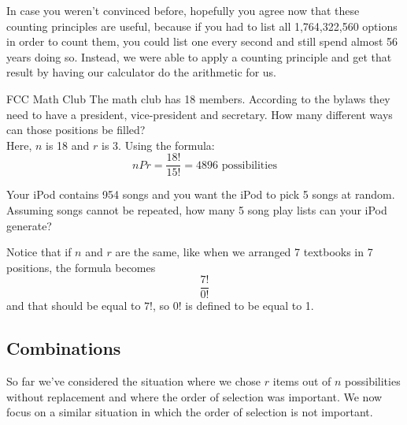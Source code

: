 In case you weren't convinced before, hopefully you agree now that these counting principles are useful, because if you had to list all 1,764,322,560 options in order to count them, you could list one every second and still spend almost 56 years doing so.  Instead, we were able to apply a counting principle and get that result by having our calculator do the arithmetic for us.

\begin{example}[https://www.youtube.com/watch?v=XGwosYiNY2I]{FCC Math Club}
The math club has 18 members. According to the bylaws they need to have a president,
vice-president and secretary. How many different ways can those positions be filled?\\

\sol Here, $n$ is 18 and $r$ is 3.  Using the formula: \[nPr = \dfrac{18!}{15!} = 4896 \textrm{ possibilities}\]
\end{example}

\begin{try}
Your iPod contains 954 songs and you want the iPod to pick 5 songs at random.
Assuming songs cannot be repeated, how many 5 song play lists can your iPod generate?
\end{try}

Notice that if $n$ and $r$ are the same, like when we arranged 7 textbooks in 7 positions, the formula becomes \[\dfrac{7!}{0!}\] and that should be equal to $7!$, so $0!$ is defined to be equal to 1.


\subsection{Combinations}
So far we've considered the situation where we chose $r$ items out of $n$ possibilities without replacement and where the order of selection was important. We now focus on a similar situation in which the order of selection is not important.

